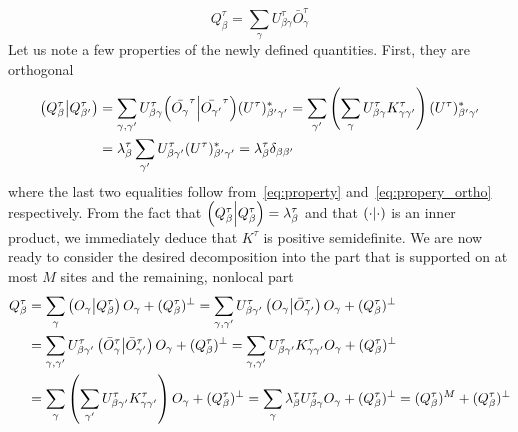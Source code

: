 \begin{equation}
  Q_{\beta}^{\tau} = \sum_{\gamma} U^{\tau}_{\beta \gamma} \bar{O}_{\gamma}^{\tau}
  \label{eq:liom}
\end{equation}
Let us note a few properties of the newly defined quantities. First, they are orthogonal
\begin{align}
  \left(Q^{\tau}_\beta \middle| Q^{\tau}_{\beta^{\prime}}\right) & = \sum_{\gamma,\gamma^{\prime}} U^{\tau}_{\beta\gamma} {\left(\bar{O_{\gamma}}^{\tau} \middle| \bar{O_{\gamma^{\prime}}}^{\tau}\right)} (U^{\tau})_{\beta^{\prime}\gamma^{\prime}}^{\ast}
  = \sum_{\gamma^{\prime}} \left(\sum_{\gamma}U^{\tau}_{\beta\gamma} K_{\gamma\gamma^{\prime}}^{\tau}\right)  (U^{\tau})_{\beta^{\prime}{\gamma^{\prime}}}^{\ast}\nonumber                                                                 \\
                                                 & = \lambda^{\tau}_{\beta} \sum_{\gamma^{\prime}} U^{\tau}_{\beta\gamma^{\prime}} (U^{\tau})_{\beta^{\prime}\gamma^{\prime}}^{\ast} = \lambda^{\tau}_{\beta} \delta_{\beta\beta^{\prime}}
\end{align}
where the last two equalities follow from~\eqref{eq:property} and~\eqref{eq:propery_ortho} respectively.
From the fact that \(\left(Q^{\tau}_{\beta} \middle| Q^{\tau}_{\beta}\right) = \lambda^{\tau}_{\beta}\) and that \(\left(\cdot \middle| \cdot\right)\) is an inner product,
we immediately deduce that \(K^{\tau}\) is positive semidefinite.
We are now ready to consider the desired decomposition into the part that is supported on at most \(M\) sites and the remaining, nonlocal part
\begin{align}
  Q^{\tau}_{\beta} & =  \sum_{\gamma} \left(O_{\gamma} \middle| Q^{\tau}_{\beta}\right)O_{\gamma} + (Q^{\tau}_{\beta})^{\perp} = \sum_{\gamma,\gamma^{\prime}} U^{\tau}_{\beta \gamma^{\prime}}\left(O_{\gamma} \middle| \bar{O}_{\gamma^{\prime}}^{\tau}\right)
  O_{\gamma}+(Q^{\tau}_{\beta})^{\perp} \nonumber                                                                                                                                                                                \\
                   & = \sum_{\gamma,\gamma^{\prime}} U^{\tau}_{\beta\gamma^{\prime}}\left(\bar{O}_{\gamma}^{\tau} \middle| \bar{O}_{\gamma^{\prime}}^{\tau}\right) O_{\gamma}+(Q^{\tau}_{\beta})^{\perp}
  = \sum_{\gamma,\gamma^{\prime}} U^{\tau}_{\beta\gamma^{\prime}}K^{\tau}_{\gamma\gamma^{\prime}} O_{\gamma}+(Q^{\tau}_{\beta})^{\perp} \nonumber                                                                                \\
                   & = \sum_{\gamma}  \left( \sum_{\gamma^{\prime}} U^{\tau}_{\beta\gamma^{\prime}}K_{\gamma\gamma^{\prime}}^{\tau}\right) O_{\gamma}+(Q^{\tau}_{\beta})^{\perp} = \sum_{\gamma}
  \lambda^{\tau}_{\beta} U^{\tau}_{\beta \gamma} O_{\gamma}+(Q^{\tau}_{\beta})^{\perp} = (Q^{\tau}_{\beta})^{M}+(Q^{\tau}_{\beta})^{\perp}
  \label{eq:decomposition2}
\end{align}
